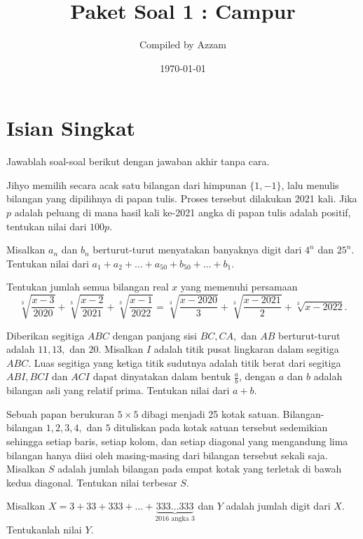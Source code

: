 \documentclass[12pt]{scrartcl}
\begin{document}
	\title{Paket Soal 1 : Campur} %
	\date{\today}
	\author{Compiled by Azzam}
	\maketitle

\renewcommand*\contentsname{Daftar Isi}
\tableofcontents

\newpage
	\newpage
	
	\section{Isian Singkat}
	Jawablah soal-soal berikut dengan jawaban akhir tanpa cara.
	
	\begin{soalbaru}
		Jihyo memilih secara acak satu bilangan dari himpunan $\{1,-1\}$, lalu menulis bilangan yang dipilihnya di papan tulis. Proses tersebut dilakukan 2021 kali. Jika $p$ adalah peluang di mana hasil kali ke-2021 angka di papan tulis adalah positif, tentukan nilai dari $100p$.
		
		
	\end{soalbaru}
	
	
	\begin{soalbaru}
		Misalkan $a_n$ dan $b_n$ berturut-turut menyatakan banyaknya digit dari $4^n$ dan $25^n$. Tentukan nilai dari $a_1+a_2+\dots +a_{50}+b_{50}+\dots+b_1$.
		
	\end{soalbaru}
	
	\begin{soalbaru}
		Tentukan jumlah semua bilangan real $x$ yang memenuhi persamaan $$\sqrt[3]{\frac{x-3}{2020}}+\sqrt[3]{\frac{x-2}{2021}}+\sqrt[3]{\frac{x-1}{2022}}=\sqrt[3]{\frac{x-2020}{3}}+\sqrt[3]{\frac{x-2021}{2}}+\sqrt[3]{x-2022}.$$
	\end{soalbaru}
	
	\begin{soalbaru}
		Diberikan segitiga $ABC$ dengan panjang sisi $BC,CA,$ dan $AB$ berturut-turut adalah $11,13,$ dan $20$. Misalkan $I$ adalah titik pusat lingkaran dalam segitiga $ABC$. Luas segitiga yang ketiga titik sudutnya adalah titik berat dari segitiga $ABI,BCI$ dan $ACI$ dapat dinyatakan dalam bentuk $\frac{a}{b}$, dengan $a$ dan $b$ adalah bilangan asli yang relatif prima. Tentukan nilai dari $a+b$.
	\end{soalbaru}
	
	\begin{soalbaru}
		Sebuah papan berukuran $5 \times 5$ dibagi menjadi 25 kotak satuan. Bilangan-bilangan $1,2,3,4,$ dan $5$ dituliskan pada kotak satuan tersebut sedemikian sehingga setiap baris, setiap kolom, dan setiap diagonal yang mengandung lima bilangan hanya diisi oleh masing-masing dari bilangan tersebut sekali saja. Misalkan $S$ adalah jumlah bilangan pada empat kotak yang terletak di bawah kedua diagonal. Tentukan nilai terbesar $S$.
	\end{soalbaru}
	\begin{soalbaru}
		Misalkan $X = 3 + 33 + 333 + \dots + \underbrace{333 \dots 333}_{2016 \text{ angka } 3}$ dan $Y$ adalah jumlah digit dari $X$. Tentukanlah nilai $Y$.
	\end{soalbaru}
	
\end{document}
